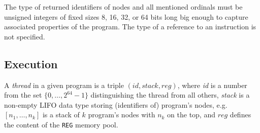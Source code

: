 \documentclass[10pt,twocolumn]{article}
\begin{document}
The type of returned identifiers of nodes and all mentioned ordinals must be
unsigned integers of fixed sizes 8, 16, 32, or 64 bits long big enough to
capture associated properties of the program. The type of a reference to an
instruction is not specified.

\subsection{Execution}
\label{sec:microcode:execution}

A \emph{thread} in a given program is a triple $
(\mathit{id},\mathit{stack},\mathit{reg}) $, where \textit{id} is a number from
the set $ \{ 0, \ldots, 2^{64}-1 \} $ distinguishing the thread from all others,
\textit{stack} is a non-empty LIFO data type storing (identifiers of) program's
nodes, e.g. $ [n_1,\ldots,n_k] $ is a stack of $ k $ program's nodes with $ n_k
$ on the top, and $ \mathit{reg} $ defines the content of the \texttt{REG}
memory pool.


\end{document}

